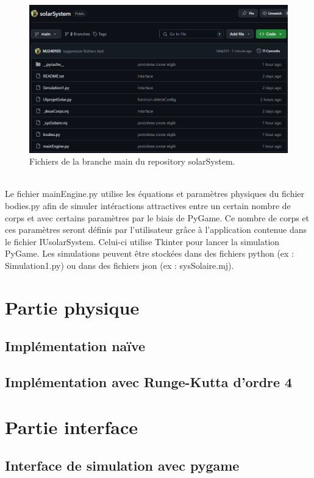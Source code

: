 \documentclass{article}
\begin{document}
    \\

    \begin{figure}[h]
        \centering
        \includegraphics[width=0.5\linewidth]{imgGitHub.png}
        \caption{\label{fig:Git}Fichiers de la branche main du repository solarSystem.}
    \end{figure}

    \\

    Le fichier mainEngine.py utilise les équations et paramètres physiques du fichier bodies.py afin de simuler intéractions attractives entre un certain nombre de corps et avec certains paramètres par le biais de PyGame. Ce nombre de corps et ces paramètres seront définis par l'utilisateur grâce à l'application contenue dans le fichier IUsolarSystem. Celui-ci utilise Tkinter pour lancer la simulation PyGame. Les simulations peuvent être stockées dans des fichiers python (ex : Simulation1.py) ou dans des fichiers json (ex : sysSolaire.mj).

\section{Partie physique}
    \subsection{Implémentation naïve}

    \subsection{Implémentation avec Runge-Kutta d'ordre 4}

\section{Partie interface}
    \subsection{Interface de simulation avec pygame}
\end{document}
